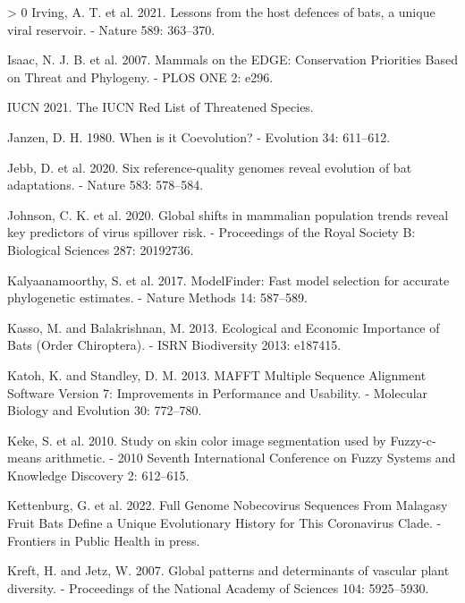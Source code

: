 \documentclass[11pt]{article}
\newlength{\cslhangindent}
\newenvironment{CSLReferences}[3] %
 {%
  \setlength{\parindent}{0pt}
  \ifodd #1 \everypar{\setlength{\hangindent}{\cslhangindent}}\ignorespaces\fi
  \ifnum #2 > 0
  \setlength{\parskip}{#2\baselineskip}
  \fi
 }%
 {}
\begin{document}
\begin{CSLReferences}{1}{0}
\leavevmode\hypertarget{ref-Irving2021LesHos}{}%
Irving, A. T. et al. 2021. Lessons from the host defences of bats, a
unique viral reservoir. - Nature 589: 363--370.

\leavevmode\hypertarget{ref-Isaac2007MamEdg}{}%
Isaac, N. J. B. et al. 2007. Mammals on the EDGE: Conservation
Priorities Based on Threat and Phylogeny. - PLOS ONE 2: e296.

\leavevmode\hypertarget{ref-IUCN2021IucRed}{}%
IUCN 2021. The IUCN Red List of Threatened Species.

\leavevmode\hypertarget{ref-Janzen1980WheIt}{}%
Janzen, D. H. 1980. When is it Coevolution? - Evolution 34: 611--612.

\leavevmode\hypertarget{ref-Jebb2020SixRef}{}%
Jebb, D. et al. 2020. Six reference-quality genomes reveal evolution of
bat adaptations. - Nature 583: 578--584.

\leavevmode\hypertarget{ref-Johnson2020GloShi}{}%
Johnson, C. K. et al. 2020. Global shifts in mammalian population trends
reveal key predictors of virus spillover risk. - Proceedings of the
Royal Society B: Biological Sciences 287: 20192736.

\leavevmode\hypertarget{ref-Kalyaanamoorthy2017ModFas}{}%
Kalyaanamoorthy, S. et al. 2017. ModelFinder: Fast model selection for
accurate phylogenetic estimates. - Nature Methods 14: 587--589.

\leavevmode\hypertarget{ref-Kasso2013EcoEco}{}%
Kasso, M. and Balakrishnan, M. 2013. Ecological and Economic Importance
of Bats (Order Chiroptera). - ISRN Biodiversity 2013: e187415.

\leavevmode\hypertarget{ref-Katoh2013MafMul}{}%
Katoh, K. and Standley, D. M. 2013. MAFFT Multiple Sequence Alignment
Software Version 7: Improvements in Performance and Usability. -
Molecular Biology and Evolution 30: 772--780.

\leavevmode\hypertarget{ref-Keke2010StuSki}{}%
Keke, S. et al. 2010. Study on skin color image segmentation used by
Fuzzy-c-means arithmetic. - 2010 Seventh International Conference on
Fuzzy Systems and Knowledge Discovery 2: 612--615.

\leavevmode\hypertarget{ref-Kettenburg2022FulGen}{}%
Kettenburg, G. et al. 2022. Full Genome Nobecovirus Sequences From
Malagasy Fruit Bats Define a Unique Evolutionary History for This
Coronavirus Clade. - Frontiers in Public Health in press.

\leavevmode\hypertarget{ref-Kreft2007GloPat}{}%
Kreft, H. and Jetz, W. 2007. Global patterns and determinants of
vascular plant diversity. - Proceedings of the National Academy of
Sciences 104: 5925--5930.


\end{CSLReferences}
\end{document}

